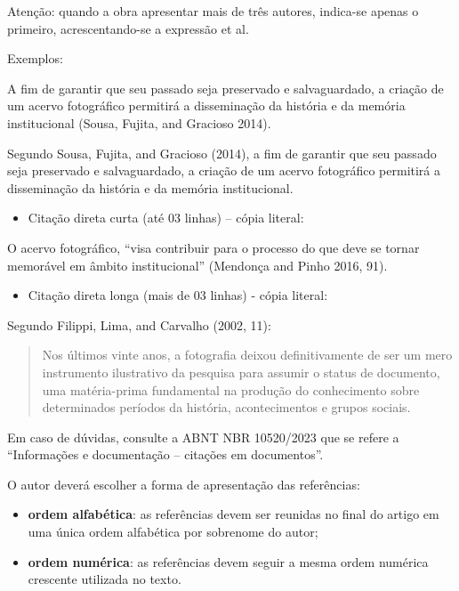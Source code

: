 \documentclass[
]{article}
\providecommand{\tightlist}{%
  \setlength{\itemsep}{0pt}\setlength{\parskip}{0pt}}
\begin{document}
Atenção: quando a obra apresentar mais de três autores, indica-se apenas
o primeiro, acrescentando-se a expressão et al.

Exemplos:

A fim de garantir que seu passado seja preservado e salvaguardado, a
criação de um acervo fotográfico permitirá a disseminação da história e
da memória institucional (Sousa, Fujita, and Gracioso 2014).

Segundo Sousa, Fujita, and Gracioso (2014), a fim de garantir que seu
passado seja preservado e salvaguardado, a criação de um acervo
fotográfico permitirá a disseminação da história e da memória
institucional.

\begin{itemize}
\tightlist
\item
  Citação direta curta (até 03 linhas) -- cópia literal:
\end{itemize}

O acervo fotográfico, ``visa contribuir para o processo do que deve se
tornar memorável em âmbito institucional'' (Mendonça and Pinho 2016,
91).

\begin{itemize}
\tightlist
\item
  Citação direta longa (mais de 03 linhas) - cópia literal:
\end{itemize}

Segundo Filippi, Lima, and Carvalho (2002, 11):

\begin{quote}
Nos últimos vinte anos, a fotografia deixou definitivamente de ser um
mero instrumento ilustrativo da pesquisa para assumir o status de
documento, uma matéria-prima fundamental na produção do conhecimento
sobre determinados períodos da história, acontecimentos e grupos
sociais.
\end{quote}

Em caso de dúvidas, consulte a ABNT NBR 10520/2023 que se refere a
``Informações e documentação -- citações em documentos''.

O autor deverá escolher a forma de apresentação das referências:

\begin{itemize}
\item
  \textbf{ordem alfabética}: as referências devem ser reunidas no final
  do artigo em uma única ordem alfabética por sobrenome do autor;
\item
  \textbf{ordem numérica}: as referências devem seguir a mesma ordem
  numérica crescente utilizada no texto.
\end{itemize}
\end{document}
